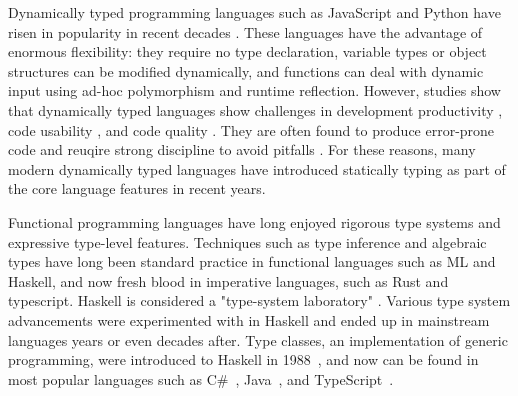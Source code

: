 


Dynamically typed programming languages such as JavaScript and Python have risen in popularity in recent decades \cite{chatley_next_2019}. These languages have the advantage of enormous flexibility: they require no type declaration, variable types or object structures can be modified dynamically, and functions can deal with dynamic input using ad-hoc polymorphism and runtime reflection. However, studies show that dynamically typed languages show challenges in development productivity \cite{kleinschmager_static_2012}, code usability \cite{mayer_empirical_2012}, and code quality \cite{gao_type_2017, ray_large-scale_2017, meyerovich_empirical_2013}. They are often found to produce error-prone code \cite{chen_empirical_2020, wang_empirical_2015,xu_python_2016} and reuqire strong discipline to avoid pitfalls \cite{chen_empirical_2020}. For these reasons, many modern dynamically typed languages have introduced statically typing as part of the core language features in recent years.

Functional programming languages have long enjoyed rigorous type systems and expressive type-level features. Techniques such as type inference and algebraic types have long been standard practice in functional languages such as ML and Haskell, and now fresh blood in imperative languages, such as Rust and typescript. Haskell is considered a "type-system laboratory" \cite{hudak_history_2007}. Various type system advancements were experimented with in Haskell and ended up in mainstream languages years or even decades after. Type classes, an implementation of generic programming, were introduced to Haskell in 1988~\cite{hudak_history_2007}, and now can be found in most popular languages such as C\#~\cite{bill_wagner_constraints_2022}, Java~\cite{oracle_generic_2022}, and TypeScript~\cite{microsoft_documentation_2022}.

